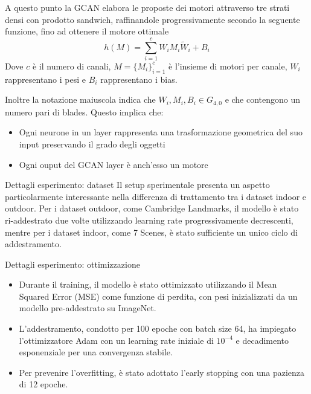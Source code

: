\begin{frame}
    A questo punto la GCAN elabora le proposte dei motori attraverso tre strati densi con prodotto sandwich, raffinandole progressivamente secondo la seguente funzione, fino ad ottenere il motore ottimale
   \[
      h(M) = \sum_{i=1}^{c} W_i M_i \tilde{W}_i + B_i
   \]
   Dove \(c\) è il numero di canali, \(M=\{M_i\}^{c}_{i=1}\) è l’insieme di motori per canale, \(W_i\) rappresentano i pesi e \(B_i\) rappresentano i bias.
\end{frame}

\begin{frame}
    Inoltre la notazione maiuscola indica che \(W_i, M_i,B_i \in G_{4,0}\) e che contengono un numero pari di blades. Questo implica che:
   \begin{itemize}
      \item Ogni neurone in un layer rappresenta una trasformazione geometrica del suo input preservando il grado degli oggetti 
      \item Ogni ouput del GCAN layer è anch’esso un motore 
   \end{itemize}
\end{frame}

\begin{frame}{Dettagli esperimento: dataset }
   Il setup sperimentale presenta un aspetto particolarmente interessante nella differenza di trattamento tra i dataset indoor e outdoor.
   Per i dataset outdoor, come Cambridge Landmarks, il modello è stato ri-addestrato due volte utilizzando learning rate progressivamente decrescenti, mentre per i dataset indoor, come 7 Scenes, è stato sufficiente un unico ciclo di addestramento. 
\end{frame}

\begin{frame}{Dettagli esperimento: ottimizzazione}
   \begin{itemize}
      \item Durante il training, il modello è stato ottimizzato utilizzando il Mean Squared Error (MSE) come funzione di perdita, con pesi inizializzati da un modello pre-addestrato su ImageNet. 
      \item L'addestramento, condotto per 100 epoche con batch size 64, ha impiegato l'ottimizzatore Adam con un learning rate iniziale di \(10^{-4}\) e decadimento esponenziale per una convergenza stabile. 
      \item Per prevenire l'overfitting, è stato adottato l’early stopping con una pazienza di 12 epoche.
   \end{itemize}
\end{frame}

